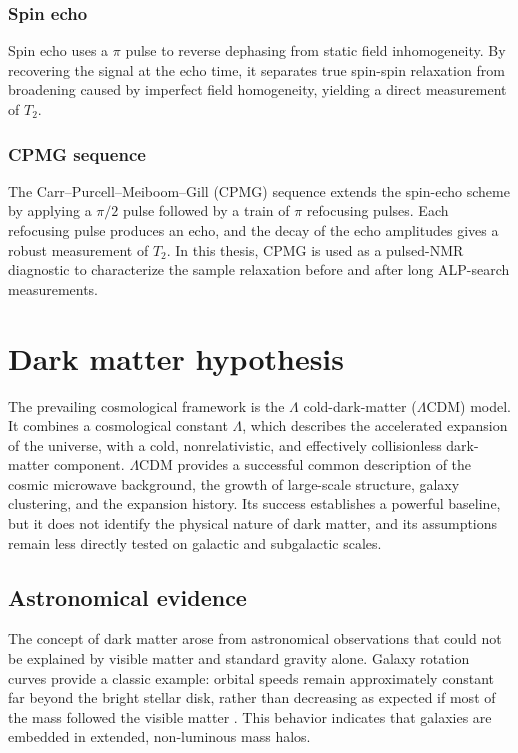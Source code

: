 \subsubsection{Spin echo}\label{sec:NMR:scheme:echo}
Spin echo uses a $\pi$ pulse to reverse dephasing from static field inhomogeneity.
By recovering the signal at the echo time, it separates true spin-spin relaxation from broadening caused by imperfect field homogeneity, yielding a direct measurement of $T_2$.

\subsubsection{CPMG sequence}\label{sec:NMR:scheme:CPMG}
The Carr--Purcell--Meiboom--Gill (CPMG) sequence extends the spin-echo scheme by applying a $\pi/2$ pulse followed by a train of $\pi$ refocusing pulses.
Each refocusing pulse produces an echo, and the decay of the echo amplitudes gives a robust measurement of $T_2$.
In this thesis, CPMG is used as a pulsed-NMR diagnostic to characterize the sample relaxation before and after long ALP-search measurements.


\section{Dark matter hypothesis}\label{sec:intro:DM}

The prevailing cosmological framework is the $\Lambda$ cold-dark-matter ($\Lambda$CDM) model.
It combines a cosmological constant $\Lambda$, which describes the accelerated expansion of the universe, with a cold, nonrelativistic, and effectively collisionless dark-matter component.
$\Lambda$CDM provides a successful common description of the cosmic microwave background, the growth of large-scale structure, galaxy clustering, and the expansion history.
Its success establishes a powerful baseline, but it does not identify the physical nature of dark matter, and its assumptions remain less directly tested on galactic and subgalactic scales.

\subsection{Astronomical evidence}

The concept of dark matter arose from astronomical observations that could not be explained by visible matter and standard gravity alone.
Galaxy rotation curves provide a classic example: orbital speeds remain approximately constant far beyond the bright stellar disk, rather than decreasing as expected if most of the mass followed the visible matter \cite{rubin1970rotation,doi:10.1146/annurev.astro.39.1.137}.
This behavior indicates that galaxies are embedded in extended, non-luminous mass halos.

